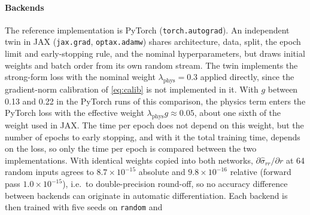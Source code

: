 \paragraph{Backends}
The reference implementation is PyTorch (\texttt{torch.autograd}). An independent
twin in JAX (\texttt{jax.grad}, \texttt{optax.adamw}) shares architecture, data,
split, the epoch limit and early-stopping rule, and the nominal hyperparameters,
but draws initial weights and batch order from its own random stream.
The twin implements the strong-form loss with the nominal weight
$\lambda_{\mathrm{phys}}=0.3$ applied directly, since the gradient-norm calibration of
\eqref{eq:calib} is not implemented in it. With $g$ between 0.13 and 0.22 in the
PyTorch runs of this comparison, the physics term enters the PyTorch loss with the
effective weight $\lambda_{\mathrm{phys}}g\approx0.05$, about one sixth of the weight used in JAX.
The time per epoch does not depend on this weight, but the number of epochs to early
stopping, and with it the total training time, depends on the loss, so only the time
per epoch is compared between the two implementations.
With identical weights copied into both networks, $\partial\hat\sigma_{rr}/\partial r$
at 64 random inputs agrees to $8.7\times10^{-15}$ absolute and $9.8\times10^{-16}$
relative (forward pass $1.0\times10^{-15}$), i.e.\ to double-precision round-off,
so no accuracy difference between backends can originate in automatic
differentiation.
Each backend is then trained with five seeds on \texttt{random} and
